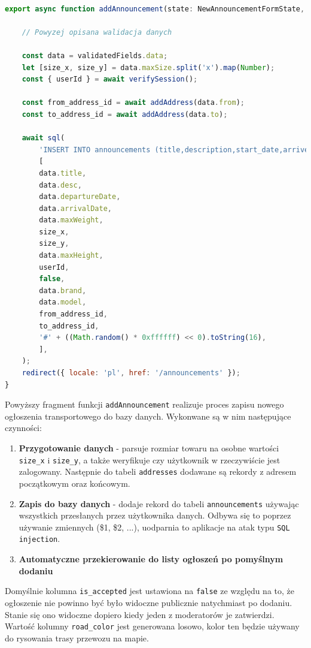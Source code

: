 {\belowcaptionskip=-9pt
\begin{lstlisting}[language=JavaScript,caption=Dodawanie ogłoszenia do bazy danych, label=lst:addAnnouncementToDB]

export async function addAnnouncement(state: NewAnnouncementFormState, formData: FormData) {
    
    // Powyzej opisana walidacja danych

    const data = validatedFields.data;
    let [size_x, size_y] = data.maxSize.split('x').map(Number);
    const { userId } = await verifySession();
    
    const from_address_id = await addAddress(data.from);
    const to_address_id = await addAddress(data.to);
    
    await sql(
        'INSERT INTO announcements (title,description,start_date,arrive_date,max_weight,size_x,size_y,max_height,author_id,is_accepted,vehicle_brand,vehicle_model,from_address_id,to_address_id,road_color)VALUES($1,$2,$3,$4,$5,$6,$7,$8,$9,$10,$11,$12,$13,$14,$15)',
        [
        data.title,
        data.desc,
        data.departureDate,
        data.arrivalDate,
        data.maxWeight,
        size_x,
        size_y,
        data.maxHeight,
        userId,
        false,
        data.brand,
        data.model,
        from_address_id,
        to_address_id,
        '#' + ((Math.random() * 0xffffff) << 0).toString(16),
        ],
    );
    redirect({ locale: 'pl', href: '/announcements' });
}
\end{lstlisting}
}

Powyższy fragment funkcji \texttt{addAnnouncement} realizuje proces zapisu nowego ogłoszenia transportowego do bazy danych. Wykonwane są w nim następujące czynności:
\begin{enumerate}
    \item \textbf{Przygotowanie danych} - parsuje rozmiar towaru na osobne wartości \texttt{size\_x} i \texttt{size\_y}, a także weryfikuje czy użytkownik w rzeczywiście jest zalogowany. Następnie do tabeli \texttt{addresses} dodawane są rekordy z adresem początkowym oraz końcowym.
    \item \textbf{Zapis do bazy danych} - dodaje rekord do tabeli \texttt{announcements} używając wszystkich przesłanych przez użytkownika danych. Odbywa się to poprzez używanie zmiennych (\$1, \$2, ...), uodparnia to aplikacje na atak typu \texttt{SQL injection}.
    \item \textbf{Automatyczne przekierowanie do listy ogłoszeń po pomyślnym dodaniu}
\end{enumerate}
Domyślnie kolumna \texttt{is\_accepted} jest ustawiona na \texttt{false} ze względu na to, że ogłoszenie nie powinno być było widoczne publicznie natychmiast po dodaniu. Stanie się ono widoczne dopiero kiedy jeden z moderatorów je zatwierdzi. Wartość kolumny \texttt{road\_color} jest generowana losowo, kolor ten będzie używany do rysowania trasy przewozu na mapie.

